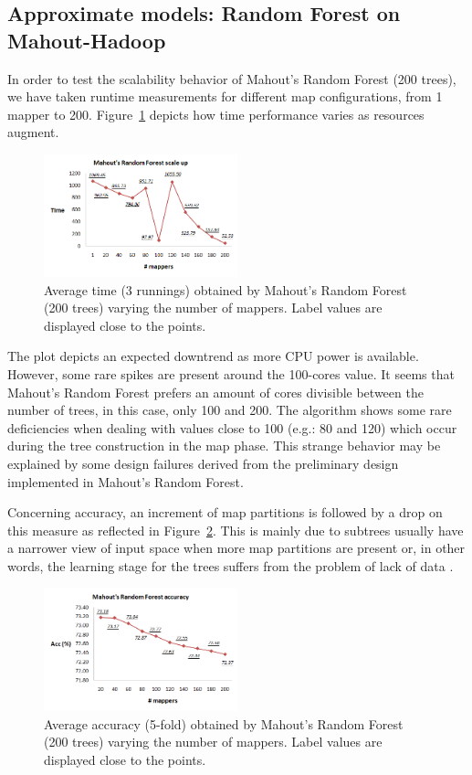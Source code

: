 \documentclass[3p,review]{elsarticle}
\begin{document}
	\subsection{Approximate models: Random Forest on Mahout-Hadoop}
	\label{subsec:rfmahout}
	
	In order to test the scalability behavior of Mahout's Random Forest (200 trees), we have taken runtime measurements for different map configurations, from 1 mapper to 200. Figure~\ref{fig:rf-mahout} depicts how time performance varies as resources augment.
	
	\begin{figure}[!htp]
		\centering
		\includegraphics[width=0.5\textwidth]{rf-mahout}
		\caption{Average time (3 runnings) obtained by Mahout's Random Forest (200 trees) varying the number of mappers. Label values are displayed close to the points.}
		\label{fig:rf-mahout}
	\end{figure}
	
	The plot depicts an expected downtrend as more CPU power is available. However, some rare spikes are present around the 100-cores value. It seems that Mahout's Random Forest prefers an amount of cores divisible between the number of trees, in this case, only 100 and 200. The algorithm shows some rare deficiencies when dealing with values close to 100 (e.g.: 80 and 120) which occur during the tree construction in the map phase. This strange behavior may be explained by some design failures derived from the preliminary design implemented in Mahout's Random Forest.
	
	Concerning accuracy, an increment of map partitions is followed by a drop on this measure as reflected in Figure~\ref{fig:rf-mahout-pred}. This is mainly due to subtrees usually have a narrower view of input space when more map partitions are present or, in other words, the learning stage for the trees suffers from the problem of lack of data \cite{Fer17}.
	
	\begin{figure}[!htp]
		\centering
		\includegraphics[width=0.5\textwidth]{rf-mahout-acc}
		\caption{Average accuracy (5-fold) obtained by Mahout's Random Forest (200 trees) varying the number of mappers. Label values are displayed close to the points.}
		\label{fig:rf-mahout-pred}
	\end{figure}
	
\end{document}

